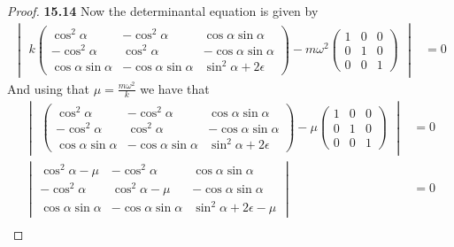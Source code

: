\documentclass[11pt]{article}
\theoremstyle{definition}
\begin{document}
\begin{proof}{\textbf{15.14}}
    Now the determinantal equation is given by
    \begin{align*}
        \begin{vmatrix}
            k\begin{pmatrix}
                \cos^2\alpha & -\cos^2\alpha & \cos\alpha\sin\alpha\\
                -\cos^2\alpha & \cos^2\alpha & -\cos\alpha\sin\alpha\\
                \cos\alpha\sin\alpha & -\cos\alpha\sin\alpha &
                \sin^2\alpha + 2\epsilon
            \end{pmatrix}
            - m\omega^2\begin{pmatrix}
                1 & 0 & 0 \\
                0 & 1 & 0 \\
                0 & 0 & 1
            \end{pmatrix}
        \end{vmatrix} &= 0
    \end{align*}
    And using that $\mu = \frac{m\omega^2}{k}$ we have that
    \begin{align*}
        \begin{vmatrix}
            \begin{pmatrix}
                \cos^2\alpha & -\cos^2\alpha & \cos\alpha\sin\alpha\\
                -\cos^2\alpha & \cos^2\alpha & -\cos\alpha\sin\alpha\\
                \cos\alpha\sin\alpha & -\cos\alpha\sin\alpha &
                \sin^2\alpha + 2\epsilon
            \end{pmatrix}
            - \mu\begin{pmatrix}
                1 & 0 & 0 \\
                0 & 1 & 0 \\
                0 & 0 & 1
            \end{pmatrix}
        \end{vmatrix} &= 0\\
        \begin{vmatrix}
            \cos^2\alpha - \mu & -\cos^2\alpha & \cos\alpha\sin\alpha\\
            -\cos^2\alpha & \cos^2\alpha - \mu & -\cos\alpha\sin\alpha\\
            \cos\alpha\sin\alpha & -\cos\alpha\sin\alpha &
            \sin^2\alpha + 2\epsilon - \mu
        \end{vmatrix} &= 0\\

\end{align*}
\end{proof}
\end{document}
